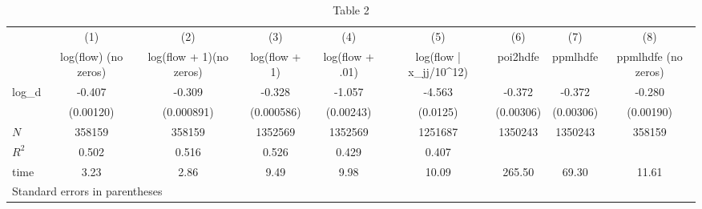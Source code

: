 \begin{table}[htbp]\centering
\caption{Table 2}
\begin{tabular}{l*{8}{c}}
\hline\hline
            &\multicolumn{1}{c}{(1)}&\multicolumn{1}{c}{(2)}&\multicolumn{1}{c}{(3)}&\multicolumn{1}{c}{(4)}&\multicolumn{1}{c}{(5)}&\multicolumn{1}{c}{(6)}&\multicolumn{1}{c}{(7)}&\multicolumn{1}{c}{(8)}\\
            &\multicolumn{1}{c}{log(flow) (no zeros)}&\multicolumn{1}{c}{log(flow + 1)(no zeros)}&\multicolumn{1}{c}{log(flow + 1)}&\multicolumn{1}{c}{log(flow + .01)}&\multicolumn{1}{c}{log(flow | x\_jj/10^12)}&\multicolumn{1}{c}{poi2hdfe}&\multicolumn{1}{c}{ppmlhdfe}&\multicolumn{1}{c}{ppmlhdfe (no zeros)}\\
\hline
log\_d       &      -0.407&      -0.309&      -0.328&      -1.057&      -4.563&      -0.372&      -0.372&      -0.280\\
            &   (0.00120)&  (0.000891)&  (0.000586)&   (0.00243)&    (0.0125)&   (0.00306)&   (0.00306)&   (0.00190)\\
\hline
\(N\)       &      358159&      358159&     1352569&     1352569&     1251687&     1350243&     1350243&      358159\\
\(R^{2}\)   &       0.502&       0.516&       0.526&       0.429&       0.407&            &            &            \\
time        &        3.23&        2.86&        9.49&        9.98&       10.09&      265.50&       69.30&       11.61\\
\hline\hline
\multicolumn{9}{l}{\footnotesize Standard errors in parentheses}\\
\end{tabular}
\end{table}
